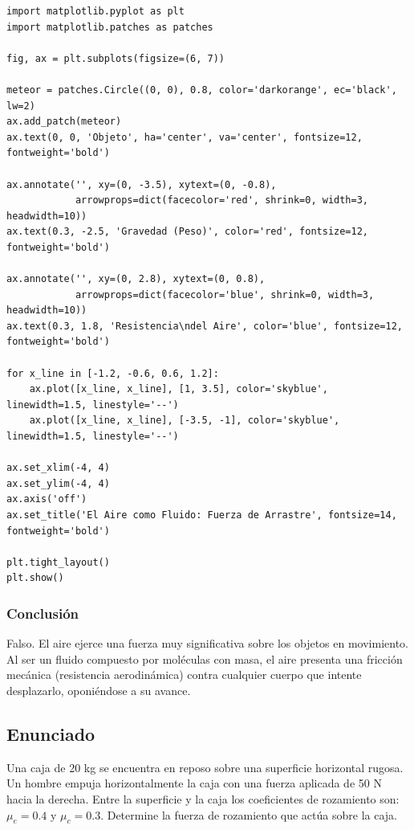 \documentclass[12pt]{article}
\begin{document}
\begin{lstlisting}
import matplotlib.pyplot as plt
import matplotlib.patches as patches

fig, ax = plt.subplots(figsize=(6, 7))

meteor = patches.Circle((0, 0), 0.8, color='darkorange', ec='black', lw=2)
ax.add_patch(meteor)
ax.text(0, 0, 'Objeto', ha='center', va='center', fontsize=12, fontweight='bold')

ax.annotate('', xy=(0, -3.5), xytext=(0, -0.8), 
            arrowprops=dict(facecolor='red', shrink=0, width=3, headwidth=10))
ax.text(0.3, -2.5, 'Gravedad (Peso)', color='red', fontsize=12, fontweight='bold')

ax.annotate('', xy=(0, 2.8), xytext=(0, 0.8), 
            arrowprops=dict(facecolor='blue', shrink=0, width=3, headwidth=10))
ax.text(0.3, 1.8, 'Resistencia\ndel Aire', color='blue', fontsize=12, fontweight='bold')

for x_line in [-1.2, -0.6, 0.6, 1.2]:
    ax.plot([x_line, x_line], [1, 3.5], color='skyblue', linewidth=1.5, linestyle='--')
    ax.plot([x_line, x_line], [-3.5, -1], color='skyblue', linewidth=1.5, linestyle='--')

ax.set_xlim(-4, 4)
ax.set_ylim(-4, 4)
ax.axis('off')
ax.set_title('El Aire como Fluido: Fuerza de Arrastre', fontsize=14, fontweight='bold')

plt.tight_layout()
plt.show()
\end{lstlisting}

\subsubsection*{Conclusión}
Falso. El aire ejerce una fuerza muy significativa sobre los objetos en movimiento. Al ser un fluido compuesto por moléculas con masa, el aire presenta una fricción mecánica (resistencia aerodinámica) contra cualquier cuerpo que intente desplazarlo, oponiéndose a su avance.

\newpage

\subsection*{Enunciado}
Una caja de 20 kg se encuentra en reposo sobre una superficie horizontal rugosa. Un hombre empuja horizontalmente la caja con una fuerza aplicada de 50 N hacia la derecha. Entre la superficie y la caja los coeficientes de rozamiento son: $\mu_e = 0.4$ y $\mu_c = 0.3$. Determine la fuerza de rozamiento que actúa sobre la caja.
\end{document}
